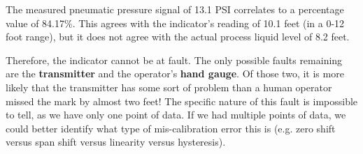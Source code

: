 \vskip 10pt

The measured pneumatic pressure signal of 13.1 PSI correlates to a percentage value of 84.17\%.  This agrees with the indicator's reading of 10.1 feet (in a 0-12 foot range), but it does not agree with the actual process liquid level of 8.2 feet.

\vskip 10pt

Therefore, the indicator cannot be at fault.  The only possible faults remaining are the {\bf transmitter} and the operator's {\bf hand gauge}.  Of those two, it is more likely that the transmitter has some sort of problem than a human operator missed the mark by almost two feet!  The specific nature of this fault is impossible to tell, as we have only one point of data.  If we had multiple points of data, we could better identify what type of mis-calibration error this is (e.g. zero shift versus span shift versus linearity versus hysteresis).




